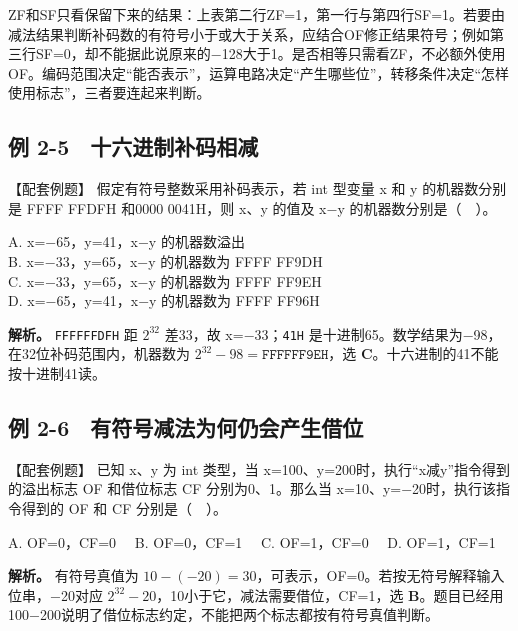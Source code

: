 ZF和SF只看保留下来的结果：上表第二行ZF=1，第一行与第四行SF=1。若要由减法结果判断补码数的有符号小于或大于关系，应结合OF修正结果符号；例如第三行SF=0，却不能据此说原来的\ensuremath{-}128大于1。是否相等只需看ZF，不必额外使用OF。编码范围决定“能否表示”，运算电路决定“产生哪些位”，转移条件决定“怎样使用标志”，三者要连起来判断。

\subsection{例 2-5　十六进制补码相减}\label{CO02-13}

\begin{example}[配套例题]

【配套例题】 假定有符号整数采用补码表示，若 int 型变量 x 和 y 的机器数分别是 FFFF FFDFH 和0000 0041H，则 x、y 的值及 x\ensuremath{-}y 的机器数分别是（　）。

A. x=\ensuremath{-}65，y=41，x\ensuremath{-}y 的机器数溢出\\
B. x=\ensuremath{-}33，y=65，x\ensuremath{-}y 的机器数为 FFFF FF9DH\\
C. x=\ensuremath{-}33，y=65，x\ensuremath{-}y 的机器数为 FFFF FF9EH\\
D. x=\ensuremath{-}65，y=41，x\ensuremath{-}y 的机器数为 FFFF FF96H

\end{example}

\textbf{解析。} \texttt{FFFFFFDFH} 距 \(2^{32}\) 差33，故 x=\ensuremath{-}33；\texttt{41H} 是十进制65。数学结果为\ensuremath{-}98，在32位补码范围内，机器数为 \(2^{32}-98=\mathtt{FFFFFF9EH}\)，选 \textbf{C}。十六进制的41不能按十进制41读。

\subsection{例 2-6　有符号减法为何仍会产生借位}\label{CO02-14}

\begin{example}[配套例题]

【配套例题】 已知 x、y 为 int 类型，当 x=100、y=200时，执行``x减y''指令得到的溢出标志 OF 和借位标志 CF 分别为0、1。那么当 x=10、y=\ensuremath{-}20时，执行该指令得到的 OF 和 CF 分别是（　）。

A. OF=0，CF=0　 B. OF=0，CF=1　 C. OF=1，CF=0　 D. OF=1，CF=1

\end{example}

\textbf{解析。} 有符号真值为 \(10-(-20)=30\)，可表示，OF=0。若按无符号解释输入位串，\ensuremath{-}20对应 \(2^{32}-20\)，10小于它，减法需要借位，CF=1，选 \textbf{B}。题目已经用100\ensuremath{-}200说明了借位标志约定，不能把两个标志都按有符号真值判断。

